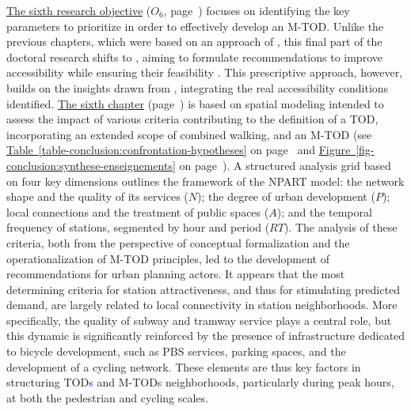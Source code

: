 \begin{refsegment}
\hyperref[objectif-6]{The sixth research objective} (\(O_6\), page~\pageref{objectif-6}) focuses on identifying the key parameters to prioritize in order to effectively develop an \acrfull{M-TOD}. Unlike the previous chapters, which were based on an approach of , this final part of the doctoral research shifts to , aiming to formulate recommendations to improve accessibility while ensuring their feasibility \textcolor{blue}{\autocite[19]{levine_mobility_2019}}. This prescriptive approach, however, builds on the insights drawn from , integrating the real accessibility conditions identified. \hyperref[chap6:titre]{The sixth chapter} (page~\pageref{chap6:titre}) is based on spatial modeling intended to assess the impact of various criteria contributing to the definition of a \acrshort{TOD}, incorporating an extended scope of combined walking, and an \acrshort{M-TOD} (see \hyperref[table-conclusion:confrontation-hypotheses]{Table~\ref{table-conclusion:confrontation-hypotheses}} on page~\pageref{table-conclusion:confrontation-hypotheses} and \hyperref[fig-conclusion:synthese-enseignements]{Figure~\ref{fig-conclusion:synthese-enseignements}} on page~\pageref{fig-conclusion:synthese-enseignements}). A structured analysis grid based on four key dimensions outlines the framework of the \acrfull{NPART} model: the network shape and the quality of its services (\(N\)); the degree of urban development (\(P\)); local connections and the treatment of public spaces (\(A\)); and the temporal frequency of stations, segmented by hour and period (\(RT\)). The analysis of these criteria, both from the perspective of conceptual formalization and the operationalization of \acrshort{M-TOD} principles, led to the development of recommendations for urban planning actors. It appears that the most determining criteria for station attractiveness, and thus for stimulating predicted demand, are largely related to local connectivity in station neighborhoods. More specifically, the quality of subway and tramway service plays a central role, but this dynamic is significantly reinforced by the presence of infrastructure dedicated to bicycle development, such as \acrfull{PBS} services, parking spaces, and the development of a cycling network. These elements are thus key factors in structuring \acrshort{TOD}\textcolor{blue}{s} and \acrshort{M-TOD}\textcolor{blue}{s} neighborhoods, particularly during peak hours, at both the pedestrian and cycling scales.%


\end{refsegment}

